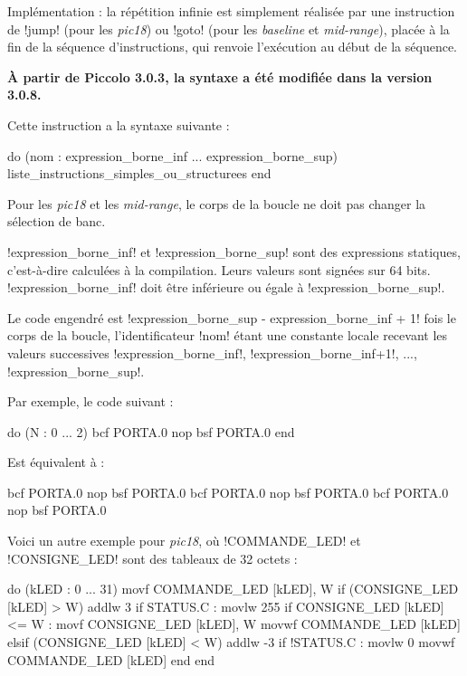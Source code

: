 Implémentation : la répétition infinie est simplement réalisée par une instruction de \pic!jump! (pour les \emph{pic18}) ou \pic!goto! (pour les \emph{baseline} et \emph{mid-range}), placée à la fin de la séquence d'instructions, qui renvoie l'exécution au début de la séquence.






\textbf{À partir de Piccolo 3.0.3, la syntaxe a été modifiée dans la version 3.0.8.}


Cette instruction a la syntaxe suivante :
\begin{piccolo}
do (nom : expression_borne_inf ... expression_borne_sup)
  liste_instructions_simples_ou_structurees
end
\end{piccolo}

Pour les \emph{pic18} et les \emph{mid-range}, le corps de la boucle ne doit pas changer la sélection de banc.

\pic!expression_borne_inf! et \pic!expression_borne_sup! sont des expressions statiques, c'est-à-dire calculées à la compilation. Leurs valeurs sont signées sur 64 bits. \pic!expression_borne_inf! doit être inférieure ou égale à \pic!expression_borne_sup!.

Le code engendré est \pic!expression_borne_sup - expression_borne_inf + 1! fois le corps de la boucle, l'identificateur \pic!nom! étant une constante locale recevant les valeurs successives \pic!expression_borne_inf!, \pic!expression_borne_inf+1!, ..., \pic!expression_borne_sup!.


Par exemple, le code suivant :
\begin{piccolo}
do (N : 0 ... 2)
  bcf PORTA.0
  nop
  bsf PORTA.0
end
\end{piccolo}

Est équivalent à :
\begin{piccolo}
bcf PORTA.0
nop
bsf PORTA.0
bcf PORTA.0
nop
bsf PORTA.0
bcf PORTA.0
nop
bsf PORTA.0
\end{piccolo}


Voici un autre exemple pour \emph{pic18}, où \pic!COMMANDE_LED! et \pic!CONSIGNE_LED! sont des tableaux de 32 octets :

\begin{piccolo}
do (kLED : 0 ... 31)
  movf COMMANDE_LED [kLED], W
  if (CONSIGNE_LED [kLED] > W)
    addlw 3
    if STATUS.C : movlw 255
    if CONSIGNE_LED [kLED] <= W : movf CONSIGNE_LED [kLED], W
    movwf COMMANDE_LED [kLED]
  elsif (CONSIGNE_LED [kLED] < W)
    addlw -3
    if !STATUS.C : movlw 0
    movwf COMMANDE_LED [kLED]
  end
end
\end{piccolo}








